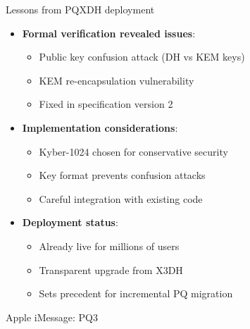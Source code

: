 \ifdefined\PRESENTATION\else\PassOptionsToClass{handout}{beamer}\fi\documentclass[aspectratio=169, lualatex]{beamer}
\begin{document}
\begin{frame}{Lessons from PQXDH deployment}
	\begin{itemize}
		\item \textbf{Formal verification revealed issues}:
		      \begin{itemize}
			      \item Public key confusion attack (DH vs KEM keys)
			      \item KEM re-encapsulation vulnerability
			      \item Fixed in specification version 2
		      \end{itemize}
		\item \textbf{Implementation considerations}:
		      \begin{itemize}
			      \item Kyber-1024 chosen for conservative security
			      \item Key format prevents confusion attacks
			      \item Careful integration with existing code
		      \end{itemize}
		\item \textbf{Deployment status}:
		      \begin{itemize}
			      \item Already live for millions of users
			      \item Transparent upgrade from X3DH
			      \item Sets precedent for incremental PQ migration
		      \end{itemize}
	\end{itemize}
\end{frame}

\begin{frame}{Apple iMessage: PQ3}
\end{frame}
\end{document}
